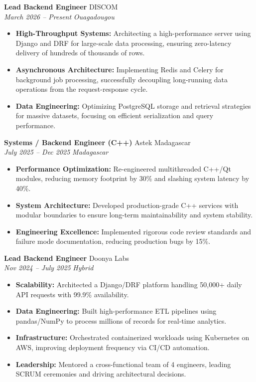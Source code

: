 \documentclass[a4paper,10pt]{article}
\newcommand{\jobheader}[4]{%
    \textbf{#1} \hfill #2 \\
    \textit{#3} \hfill \textit{#4}
    \vspace{0.05cm}
}
\begin{document}
\jobheader{Lead Backend Engineer}{DISCOM}{March 2026 -- Present}{Ouagadougou}
\begin{itemize}[leftmargin=*,nosep]
    \item \textbf{High-Throughput Systems:} Architecting a high-performance server using Django and DRF for large-scale data processing, ensuring zero-latency delivery of hundreds of thousands of rows.
    \item \textbf{Asynchronous Architecture:} Implementing Redis and Celery for background job processing, successfully decoupling long-running data operations from the request-response cycle.
    \item \textbf{Data Engineering:} Optimizing PostgreSQL storage and retrieval strategies for massive datasets, focusing on efficient serialization and query performance.
\end{itemize}

\vspace{0.15cm}

\jobheader{Systems / Backend Engineer (C++)}{Astek Madagascar}{July 2025 -- Dec 2025}{Madagascar}
\begin{itemize}[leftmargin=*,nosep]
    \item \textbf{Performance Optimization:} Re-engineered multithreaded C++/Qt modules, reducing memory footprint by 30\% and slashing system latency by 40\%.
    \item \textbf{System Architecture:} Developed production-grade C++ services with modular boundaries to ensure long-term maintainability and system stability.
    \item \textbf{Engineering Excellence:} Implemented rigorous code review standards and failure mode documentation, reducing production bugs by 15\%.
\end{itemize}

\vspace{0.15cm}

\jobheader{Lead Backend Engineer}{Doonya Labs}{Nov 2024 -- July 2025}{Hybrid}
\begin{itemize}[leftmargin=*,nosep]
    \item \textbf{Scalability:} Architected a Django/DRF platform handling 50,000+ daily API requests with 99.9\% availability.
    \item \textbf{Data Engineering:} Built high-performance ETL pipelines using pandas/NumPy to process millions of records for real-time analytics.
    \item \textbf{Infrastructure:} Orchestrated containerized workloads using Kubernetes on AWS, improving deployment frequency via CI/CD automation.
    \item \textbf{Leadership:} Mentored a cross-functional team of 4 engineers, leading SCRUM ceremonies and driving architectural decisions.
\end{itemize}
\end{document}
